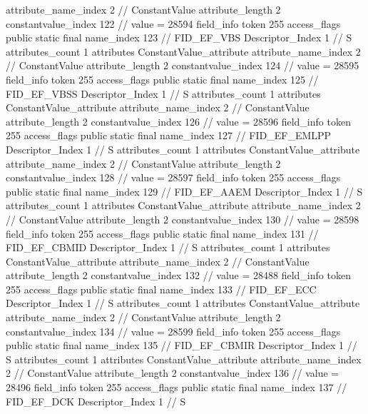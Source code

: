 {{{{{{{					attribute_name_index	2		// ConstantValue
					attribute_length	2
					constantvalue_index	122		// value = 28594
				}
				}
			}
			field_info {
				token	255
				access_flags	public static final
				name_index	123		// FID_EF_VBS
				Descriptor_Index	1		// S
				attributes_count	1
				attributes {
				ConstantValue_attribute {
					attribute_name_index	2		// ConstantValue
					attribute_length	2
					constantvalue_index	124		// value = 28595
				}
				}
			}
			field_info {
				token	255
				access_flags	public static final
				name_index	125		// FID_EF_VBSS
				Descriptor_Index	1		// S
				attributes_count	1
				attributes {
				ConstantValue_attribute {
					attribute_name_index	2		// ConstantValue
					attribute_length	2
					constantvalue_index	126		// value = 28596
				}
				}
			}
			field_info {
				token	255
				access_flags	public static final
				name_index	127		// FID_EF_EMLPP
				Descriptor_Index	1		// S
				attributes_count	1
				attributes {
				ConstantValue_attribute {
					attribute_name_index	2		// ConstantValue
					attribute_length	2
					constantvalue_index	128		// value = 28597
				}
				}
			}
			field_info {
				token	255
				access_flags	public static final
				name_index	129		// FID_EF_AAEM
				Descriptor_Index	1		// S
				attributes_count	1
				attributes {
				ConstantValue_attribute {
					attribute_name_index	2		// ConstantValue
					attribute_length	2
					constantvalue_index	130		// value = 28598
				}
				}
			}
			field_info {
				token	255
				access_flags	public static final
				name_index	131		// FID_EF_CBMID
				Descriptor_Index	1		// S
				attributes_count	1
				attributes {
				ConstantValue_attribute {
					attribute_name_index	2		// ConstantValue
					attribute_length	2
					constantvalue_index	132		// value = 28488
				}
				}
			}
			field_info {
				token	255
				access_flags	public static final
				name_index	133		// FID_EF_ECC
				Descriptor_Index	1		// S
				attributes_count	1
				attributes {
				ConstantValue_attribute {
					attribute_name_index	2		// ConstantValue
					attribute_length	2
					constantvalue_index	134		// value = 28599
				}
				}
			}
			field_info {
				token	255
				access_flags	public static final
				name_index	135		// FID_EF_CBMIR
				Descriptor_Index	1		// S
				attributes_count	1
				attributes {
				ConstantValue_attribute {
					attribute_name_index	2		// ConstantValue
					attribute_length	2
					constantvalue_index	136		// value = 28496
				}
				}
			}
			field_info {
				token	255
				access_flags	public static final
				name_index	137		// FID_EF_DCK
				Descriptor_Index	1		// S
}}}}}
